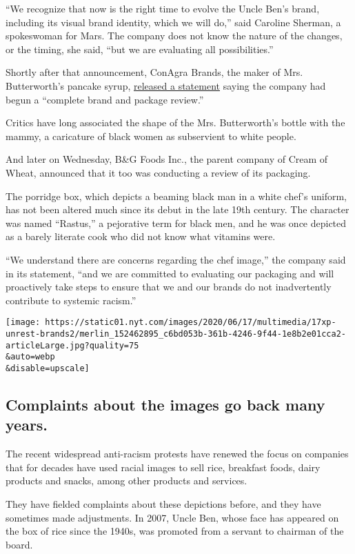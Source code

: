 ``We recognize that now is the right time to evolve the Uncle Ben's
brand, including its visual brand identity, which we will do,'' said
Caroline Sherman, a spokeswoman for Mars. The company does not know the
nature of the changes, or the timing, she said, ``but we are evaluating
all possibilities.''

Shortly after that announcement, ConAgra Brands, the maker of Mrs.
Butterworth's pancake syrup,
\href{https://www.conagrabrands.com/news-room/news-conagra-brands-announces-mrs-butterworths-brand-review-prn-122733}{released
a statement} saying the company had begun a ``complete brand and package
review.''

Critics have long associated the shape of the Mrs. Butterworth's bottle
with the mammy, a caricature of black women as subservient to white
people.

And later on Wednesday, B\&G Foods Inc., the parent company of Cream of
Wheat, announced that it too was conducting a review of its packaging.

The porridge box, which depicts a beaming black man in a white chef's
uniform, has not been altered much since its debut in the late 19th
century. The character was named ``Rastus,'' a pejorative term for black
men, and he was once depicted as a barely literate cook who did not know
what vitamins were.

``We understand there are concerns regarding the chef image,'' the
company said in its statement, ``and we are committed to evaluating our
packaging and will proactively take steps to ensure that we and our
brands do not inadvertently contribute to systemic racism.''

\texttt{[image: https://static01.nyt.com/images/2020/06/17/multimedia/17xp-unrest-brands2/merlin\_152462895\_c6bd053b-361b-4246-9f44-1e8b2e01cca2-articleLarge.jpg?quality=75\\\&auto=webp\\\&disable=upscale]}

\hypertarget{complaints-about-the-images-go-back-many-years}{%
\subsection{Complaints about the images go back many
years.}\label{complaints-about-the-images-go-back-many-years}}

The recent widespread anti-racism protests have renewed the focus on
companies that for decades have used racial images to sell rice,
breakfast foods, dairy products and snacks, among other products and
services.

They have fielded complaints about these depictions before, and they
have sometimes made adjustments. In 2007, Uncle Ben, whose face has
appeared on the box of rice since the 1940s, was promoted from a servant
to chairman of the board.

